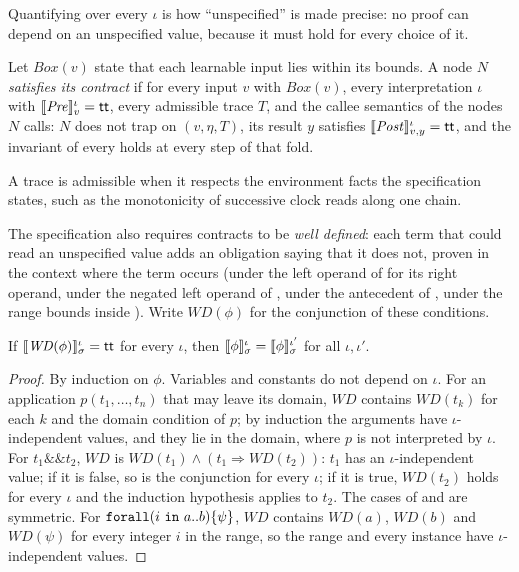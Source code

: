 Quantifying over every $\iota$ is how ``unspecified'' is made precise: no proof can depend on
an unspecified value, because it must hold for every choice of it.

\begin{definition}\label{def:satisfies}
Let $\mathit{Box}(v)$ state that each learnable input lies within its bounds. A node $N$
\emph{satisfies its contract} if for every input $v$ with $\mathit{Box}(v)$, every
interpretation $\iota$ with $\llbracket \mathit{Pre} \rrbracket^\iota_v=\mathsf{tt}$, every admissible trace $T$, and the
callee semantics of the nodes $N$ calls: $N$ does not trap on $(v,\eta,T)$, its result $y$
satisfies $\llbracket \mathit{Post} \rrbracket^\iota_{v,y}=\mathsf{tt}$, and the invariant of every  holds
at every step of that fold.
\end{definition}

A trace is admissible when it respects the environment facts the specification states, such
as the monotonicity of successive clock reads along one chain.

The specification also requires contracts to be \emph{well defined}: each term that could
read an unspecified value adds an obligation saying that it does not, proven in the context
where the term occurs (under the left operand of \kw{\&\&} for its right operand, under the
negated left operand of \kw{||}, under the antecedent of \kw{==>}, under the range bounds
inside ). Write $\mathit{WD}(\phi)$ for the conjunction of these conditions.

\begin{lemma}\label{lem:wd}
If $\llbracket \mathit{WD}(\phi) \rrbracket^\iota_\sigma=\mathsf{tt}$ for every $\iota$, then
$\llbracket \phi \rrbracket^\iota_\sigma=\llbracket \phi \rrbracket^{\iota'}_\sigma$ for all $\iota,\iota'$.
\end{lemma}
\begin{proof}
By induction on $\phi$. Variables and constants do not depend on $\iota$. For an application
$p(t_1,\dots,t_n)$ that may leave its domain, $\mathit{WD}$ contains $\mathit{WD}(t_k)$ for each
$k$ and the domain condition of $p$; by induction the arguments have $\iota$-independent values,
and they lie in the domain, where $p$ is not interpreted by $\iota$. For $t_1\mathbin{\&\&}t_2$,
$\mathit{WD}$ is $\mathit{WD}(t_1)\wedge(t_1\Rightarrow\mathit{WD}(t_2))$: $t_1$ has an
$\iota$-independent value; if it is false, so is the conjunction for every $\iota$; if it is
true, $\mathit{WD}(t_2)$ holds for every $\iota$ and the induction hypothesis applies to $t_2$.
The cases of \kw{||} and \kw{==>} are symmetric. For $\texttt{forall}(i\ \texttt{in}\ a..b)\{\psi\}$,
$\mathit{WD}$ contains $\mathit{WD}(a)$, $\mathit{WD}(b)$ and $\mathit{WD}(\psi)$ for every
integer $i$ in the range, so the range and every instance have $\iota$-independent values.
\end{proof}


